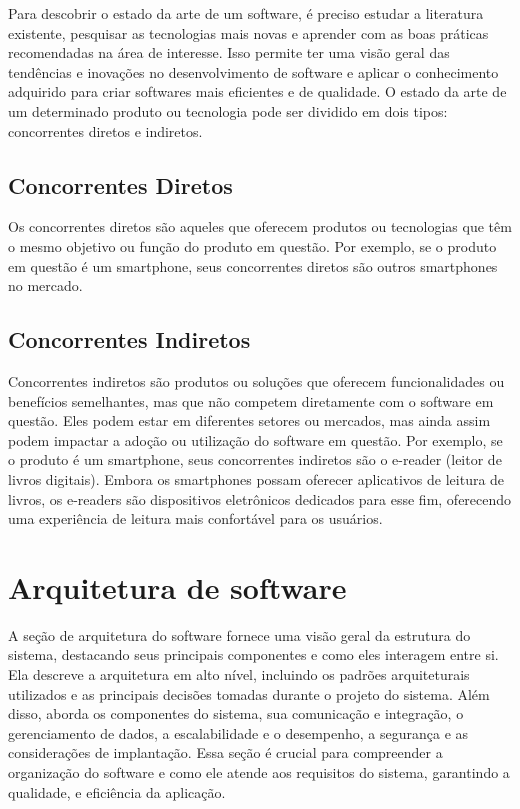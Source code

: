 \documentclass[12pt]{article}
\begin{document}
Para descobrir o estado da arte de um software, é preciso estudar a literatura existente, pesquisar as tecnologias mais novas e aprender com as boas práticas recomendadas na área de interesse. Isso permite ter uma visão geral das tendências e inovações no desenvolvimento de software e aplicar o conhecimento adquirido para criar softwares mais eficientes e de qualidade. O estado da arte de um determinado produto ou tecnologia pode ser dividido em dois tipos: concorrentes diretos e indiretos.
\subsection{Concorrentes Diretos}
Os concorrentes diretos são aqueles que oferecem produtos ou tecnologias que têm o mesmo objetivo ou função do produto em questão. Por exemplo, se o produto em questão é um smartphone, seus concorrentes diretos são outros smartphones no mercado.
\subsection{Concorrentes Indiretos}
Concorrentes indiretos são produtos ou soluções que oferecem funcionalidades ou benefícios semelhantes, mas que não competem diretamente com o software em questão. Eles podem estar em diferentes setores ou mercados, mas ainda assim podem impactar a adoção ou utilização do software em questão. Por exemplo, se o produto é um smartphone, seus concorrentes indiretos são o e-reader (leitor de livros digitais). Embora os smartphones possam oferecer aplicativos de leitura de livros, os e-readers são dispositivos eletrônicos dedicados para esse fim, oferecendo uma experiência de leitura mais confortável para os usuários. 

\section{Arquitetura de software}\label{sec:figs}
A seção de arquitetura do software fornece uma visão geral da estrutura do sistema, destacando seus principais componentes e como eles interagem entre si. Ela descreve a arquitetura em alto nível, incluindo os padrões arquiteturais utilizados e as principais decisões tomadas durante o projeto do sistema. Além disso, aborda os componentes do sistema, sua comunicação e integração, o gerenciamento de dados, a escalabilidade e o desempenho, a segurança e as considerações de implantação. Essa seção é crucial para compreender a organização do software e como ele atende aos requisitos do sistema, garantindo a qualidade,  e eficiência da aplicação.
\end{document}

